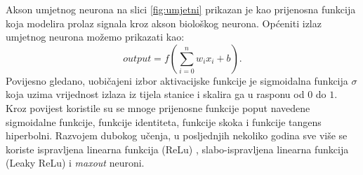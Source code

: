\documentclass[times, utf8, diplomski]{fer}
\theoremstyle{definition}
\begin{document}
Akson umjetnog neurona na slici \ref{fig:umjetni} prikazan je kao prijenosna funkcija  koja modelira prolaz signala kroz akson biološkog neurona. Općeniti izlaz umjetnog neurona možemo prikazati kao:
\begin{equation}
output = f(\sum_{i=0}^{n}w_ix_i + b).
\end{equation}
Povijesno gledano, uobičajeni izbor aktivacijske funkcije je sigmoidalna funkcija $\sigma$ koja uzima vrijednost izlaza iz tijela stanice i skalira ga u rasponu od $0$ do $1$. Kroz povijest koristile su se mnoge prijenosne funkcije poput  navedene sigmoidalne funkcije, funkcije identiteta, funkcije skoka i funkcije tangens hiperbolni. Razvojem dubokog učenja, u posljednjih nekoliko godina sve više se koriste ispravljena linearna funkcija (ReLu) , slabo-ispravljena linearna funkcija (Leaky ReLu)  i \textit{maxout} neuroni.
\end{document}
